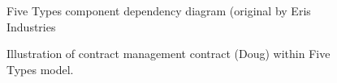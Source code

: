 \begin{figure}
\centering
{}
\decoRule
\caption[Five Types Dependency Graph]{Five Types component dependency diagram (original by Eris Industries \cite{FiveTypes}}
\label{fig:FiveTypesSystem}
\end{figure}

\begin{figure}
\centering
{}
\decoRule
\caption[Five Types Contract Management Contract Interaction]{Illustration of contract management contract (Doug) within Five Types model.}
\label{fig:FiveTypesDOUG}
\end{figure}

